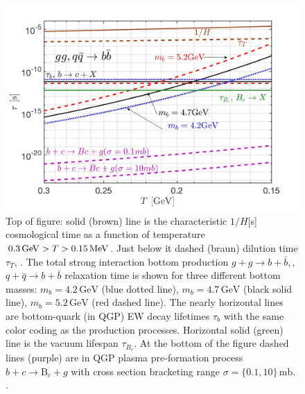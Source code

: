 \begin{figure} 
\centerline{\includegraphics[width=0.9\linewidth]{./plots/BQuarkReactionTime003}}
\caption{{\color{black}Top of figure: solid (brown) line is the characteristic $1/H$[s] cosmological time as a function of temperature $0.3\,\mathrm{GeV}>T> 0.15\text{\,MeV}$. Just below it dashed (braun) dilution time $\tau_T$, . The total strong interaction bottom production $g+g\to b+\bar{b},$, $q+\bar q\to b+\bar{b}$ relaxation time is shown for three different bottom masses: $m_b=4.2\,\mathrm{GeV}$ (blue dotted line), $m_b=4.7\,\mathrm{GeV}$ (black solid line), $m_b=5.2\,\mathrm{GeV}$ (red dashed line). The nearly horizontal lines are bottom-quark (in QGP) EW decay lifetimes $\tau_b$ with the same color coding as the production processes. Horizontal solid (green) line is the vacuum lifespan $\tau_{B_c}$. At the bottom of the figure dashed lines (purple) are in QGP plasma pre-formation process $b+c\rightarrow \mathrm{B}_c+g$ with cross section bracketing range $\sigma=\{0.1,10\} \,\mathrm{mb}$. .
}}
\label{ReactionTime}
\end{figure}

